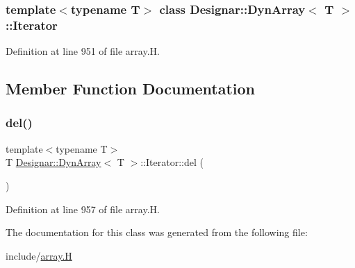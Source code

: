 \subsubsection*{template$<$typename T$>$\newline
class Designar\+::\+Dyn\+Array$<$ T $>$\+::\+Iterator}



Definition at line 951 of file array.\+H.



\subsection{Member Function Documentation}
\mbox{\label{class_designar_1_1_dyn_array_1_1_iterator_a3d700006f23d3c4b63e109edef32410f}} 
\subsubsection{\texorpdfstring{del()}{del()}}
{\footnotesize\ttfamily template$<$typename T$>$ \\
T \hyperlink{class_designar_1_1_dyn_array}{Designar\+::\+Dyn\+Array}$<$ T $>$\+::Iterator\+::del (\begin{DoxyParamCaption}{ }\end{DoxyParamCaption})\hspace{0.3cm}{\ttfamily [inline]}}



Definition at line 957 of file array.\+H.



The documentation for this class was generated from the following file\+:\begin{DoxyCompactItemize}
\item 
include/\hyperlink{array_8_h}{array.\+H}\end{DoxyCompactItemize}
